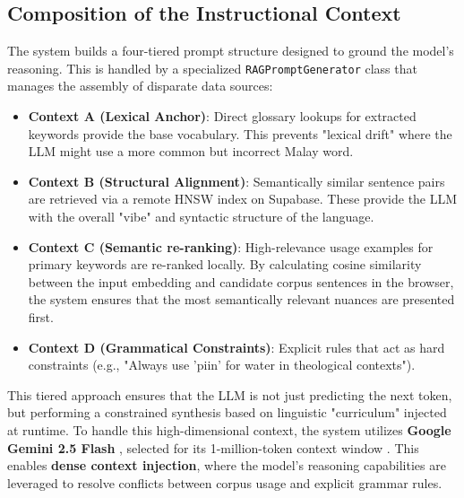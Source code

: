 \documentclass[12pt]{article}
\begin{document}
\subsection{Composition of the Instructional Context}
The system builds a four-tiered prompt structure designed to ground the model's reasoning. This is handled by a specialized \texttt{RAGPromptGenerator} class that manages the assembly of disparate data sources:
\begin{itemize}
    \item \textbf{Context A (Lexical Anchor)}: Direct glossary lookups for extracted keywords provide the base vocabulary. This prevents "lexical drift" where the LLM might use a more common but incorrect Malay word.
    \item \textbf{Context B (Structural Alignment)}: Semantically similar sentence pairs are retrieved via a remote HNSW index on Supabase. These provide the LLM with the overall "vibe" and syntactic structure of the language.
    \item \textbf{Context C (Semantic re-ranking)}: High-relevance usage examples for primary keywords are re-ranked locally. By calculating cosine similarity between the input embedding and candidate corpus sentences in the browser, the system ensures that the most semantically relevant nuances are presented first.
    \item \textbf{Context D (Grammatical Constraints)}: Explicit rules that act as hard constraints (e.g., "Always use 'piin' for water in theological contexts").
\end{itemize}

This tiered approach ensures that the LLM is not just predicting the next token, but performing a constrained synthesis based on linguistic "curriculum" injected at runtime. To handle this high-dimensional context, the system utilizes \textbf{Google Gemini 2.5 Flash} \cite{vertex_ai}, selected for its 1-million-token context window \cite{data_studios_gemini}. This enables \textbf{dense context injection}, where the model's reasoning capabilities \cite{llm_stats} are leveraged to resolve conflicts between corpus usage and explicit grammar rules.

\begin{table}[ht]
\centering
\caption{System Performance Metrics: Client-Side Retrieval and Synthesis}
\label{tab:benchmarks}
\end{table}
\end{document}
